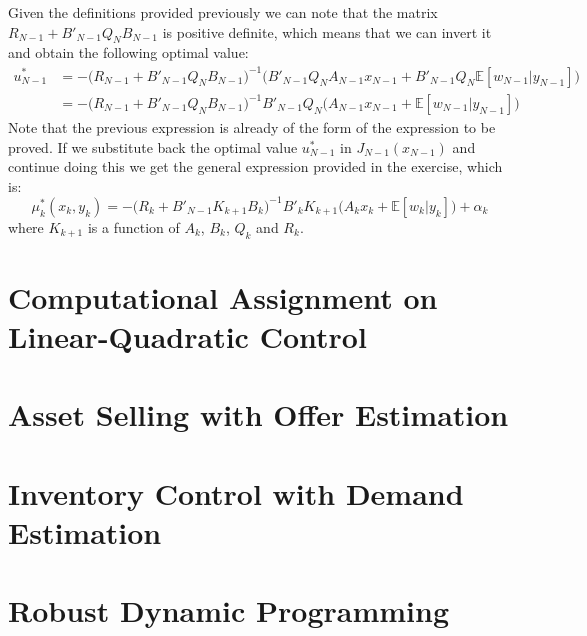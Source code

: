 \documentclass[11pt, oneside]{article}   	%
\begin{document}
Given the definitions provided previously we can note that the matrix $R_{N-1} + B'_{N-1}Q_{N}B_{N-1}$ is positive definite, which means that we can invert it and obtain the following optimal value:
\begin{align*}
u_{N-1}^{*} &= - \big(R_{N-1} + B'_{N-1}Q_{N}B_{N-1}\big)^{-1}\big(B'_{N-1}Q_{N}A_{N-1}x_{N-1} + B'_{N-1}Q_{N} \mathbb{E}[w_{N-1}|y_{N-1}]\big)\\
&= - \big(R_{N-1} + B'_{N-1}Q_{N}B_{N-1}\big)^{-1}B'_{N-1}Q_{N}\big(A_{N-1}x_{N-1} +\mathbb{E}[w_{N-1}|y_{N-1}]\big)
\end{align*}
Note that the previous expression is already of the form of the expression to be proved. If we substitute back the optimal value $u_{N-1}^{*}$ in $J_{N-1}(x_{N-1})$ and continue doing this we get the general expression provided in the exercise, which is:
$$\mu_{k}^{*}(x_{k},y_{k}) = - \big(R_{k} + B'_{N-1}K_{k+1}B_{k}\big)^{-1}B'_{k}K_{k+1}\big(A_{k}x_{k} + \mathbb{E}[w_{k}|y_{k}]\big) + \alpha_{k}$$
where $K_{k+1}$ is a function of $A_{k}$, $B_{k}$, $Q_{k}$ and $R_{k}$.

\section{Computational Assignment on Linear-Quadratic Control}


\section{Asset Selling with Offer Estimation}


\section{Inventory Control with Demand Estimation}


\section{Robust Dynamic Programming}
\end{document}
